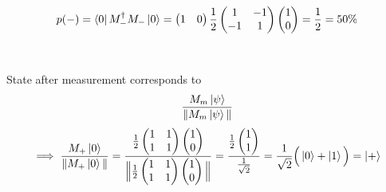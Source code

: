 \documentclass[a4paper, 12pt]{article}
\begin{document}
\begin{flushleft}
\[p(-)=\bra{0}M_{-}^{\dagger}M_{-}\ket{0} = \begin{pmatrix}
    1 & 0\\
\end{pmatrix} \frac{1}{2} \begin{pmatrix}
    1 & -1 \\
    -1 & 1 \\
\end{pmatrix} \begin{pmatrix}
    1 \\
    0 \\
\end{pmatrix} = \frac{1}{2} = 50\%\] \\~\\
State after measurement corresponds to \[\frac{M_{m} \ket{\psi}}{\|M_{m} \ket{\psi}\|}\]
\[\implies \frac{M_{+} \ket{0}}{\|M_{+} \ket{0}\|} = \frac{\frac{1}{2} \begin{pmatrix}
    1 & 1\\
    1 & 1\\
\end{pmatrix} \begin{pmatrix}
    1 \\
    0 \\
\end{pmatrix}}{\Big\|\frac{1}{2} \begin{pmatrix}
    1 & 1\\
    1 & 1\\
\end{pmatrix} \begin{pmatrix}
    1 \\
    0 \\
\end{pmatrix}\Big\|}  = \frac{\frac{1}{2}\begin{pmatrix}
    1 \\
    1\\
\end{pmatrix}}{\frac{1}{\sqrt{2}}} = \frac{1}{\sqrt{2}}\Big( \ket{0} +\ket{1} \Big) = \ket{+}\]


\end{flushleft}
\end{document}
